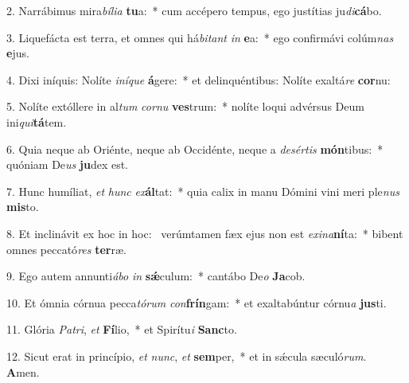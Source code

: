 2. Narrábimus mira\textit{bí}\textit{li}\textit{a} \textbf{tu}a:~*  cum accépero tempus, ego justítias ju\textit{di}\textbf{cá}bo.\

3. Liquefácta est terra, et omnes qui há\textit{bi}\textit{tant} \textit{in} \textbf{e}a:~*  ego confirmávi colúm\textit{nas} \textbf{e}jus.\

4. Dixi iníquis: Nolíte \textit{in}\textit{í}\textit{que} \textbf{á}gere:~*  et delinquéntibus: Nolíte exaltá\textit{re} \textbf{cor}nu:\

5. Nolíte extóllere in al\textit{tum} \textit{cor}\textit{nu} \textbf{ves}trum:~*  nolíte loqui advérsus Deum ini\textit{qui}\textbf{tá}tem.\

6. Quia neque ab Oriénte, neque ab Occidénte, neque a \textit{de}\textit{sér}\textit{tis} \textbf{món}tibus:~*  quóniam De\textit{us} \textbf{ju}dex est.\

7. Hunc humíliat, \textit{et} \textit{hunc} \textit{ex}\textbf{ál}tat:~*  quia calix in manu Dómini vini meri ple\textit{nus} \textbf{mis}to.\

8. Et inclinávit ex hoc in hoc: \dag\  verúmtamen fæx ejus non est \textit{ex}\textit{i}\textit{na}\textbf{ní}ta:~*  bibent omnes peccató\textit{res} \textbf{ter}ræ.\

9. Ego autem annunti\textit{á}\textit{bo} \textit{in} \textbf{sǽ}culum:~*  cantábo De\textit{o} \textbf{Ja}cob.\

10. Et ómnia córnua pecca\textit{tó}\textit{rum} \textit{con}\textbf{frín}gam:~*  et exaltabúntur córnu\textit{a} \textbf{jus}ti.\

11. Glória \textit{Pa}\textit{tri}, \textit{et} \textbf{Fí}lio,~*  et Spirítu\textit{i} \textbf{Sanc}to.\

12. Sicut erat in princípio, \textit{et} \textit{nunc}, \textit{et} \textbf{sem}per,~*  et in sǽcula sæculó\textit{rum}. \textbf{A}men.\


